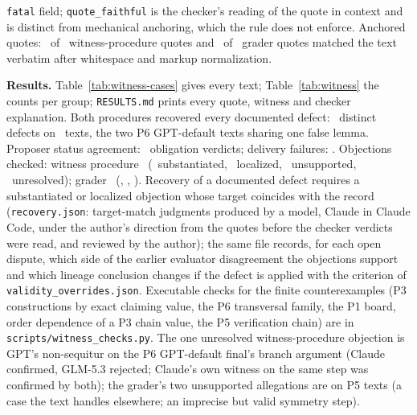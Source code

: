 \texttt{fatal} field; \texttt{quote\_faithful} is the checker's reading of the quote in context and is distinct from mechanical anchoring, which the rule does not enforce. Anchored quotes: \WITNESSANCHORED\ of \WITNESSTOTAL\ witness-procedure quotes and \GRADERANCHORED\ of \GRADERTOTAL\ grader quotes matched the text verbatim after whitespace and markup normalization.

\textbf{Results.} Table~\ref{tab:witness-cases} gives every text; Table~\ref{tab:witness} the counts per group; \texttt{RESULTS.md} prints every quote, witness and checker explanation. Both procedures recovered every documented defect: \CRWitnessDistinctDefects\ distinct defects on \CRWitnessKnownTexts\ texts, the two P6 GPT-default texts sharing one false lemma. Proposer status agreement: \WITNESSAGREE\ obligation verdicts; delivery failures: \WITNESSFAILS. Objections checked: witness procedure \WITNESSTOTAL\ (\WITNESSSUBST\ substantiated, \WITNESSLOCAL\ localized, \WITNESSREJECTED\ unsupported, \WITNESSCONTESTED\ unresolved); grader \GRADERTOTAL\ (\GRADERSUBST, \GRADERLOCAL, \GRADERREJECTED). Recovery of a documented defect requires a substantiated or localized objection whose target coincides with the record (\texttt{recovery.json}: target-match judgments produced by a model, Claude in Claude Code, under the author's direction from the quotes before the checker verdicts were read, and reviewed by the author); the same file records, for each open dispute, which side of the earlier evaluator disagreement the objections support and which lineage conclusion changes if the defect is applied with the criterion of \texttt{validity\_overrides.json}. Executable checks for the finite counterexamples (P3 constructions by exact claiming value, the P6 transversal family, the P1 board, order dependence of a P3 chain value, the P5 verification chain) are in \texttt{scripts/\allowbreak witness\_checks.py}. The one unresolved witness-procedure objection is GPT's non-sequitur on the P6 GPT-default final's branch argument (Claude confirmed, GLM-5.3 rejected; Claude's own witness on the same step was confirmed by both); the grader's two unsupported allegations are on P5 texts (a case the text handles elsewhere; an imprecise but valid symmetry step).

